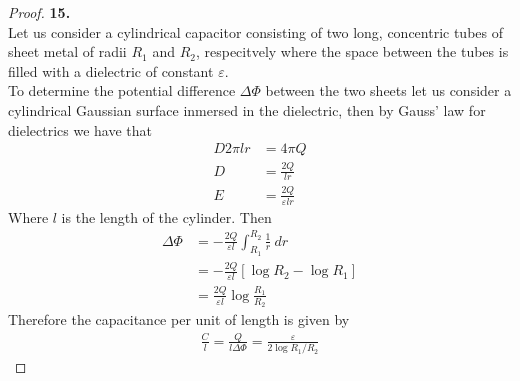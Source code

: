 \documentclass[11pt]{article}
\theoremstyle{definition}
\begin{document}
\cleardoublepage
\begin{proof}{\textbf{15.}}\\
Let us consider a cylindrical capacitor consisting of two long, concentric
tubes of sheet metal of radii $R_1$ and $R_2$, respecitvely where the space
between the tubes is filled with a dielectric of constant $\varepsilon$.
\\
To determine the potential difference $\Delta\Phi$ between the two sheets let
us consider a cylindrical Gaussian surface inmersed in the dielectric, then by
Gauss' law for dielectrics we have that
\begin{align*}
    D 2\pi l r &= 4\pi Q\\
    D &= \frac{2Q}{l r}\\
    E &= \frac{2Q}{\varepsilon lr}
\end{align*}
Where $l$ is the length of the cylinder. Then
\begin{align*}
    \Delta \Phi
    &= -\frac{2Q}{\varepsilon l} \int_{R_1}^{R_2} \frac{1}{r} ~dr\\
    &= -\frac{2Q}{\varepsilon l} [\log{R_2} - \log{R_1}]\\
    &= \frac{2Q}{\varepsilon l} \log \frac{R_1}{R_2}
\end{align*}
Therefore the capacitance per unit of length is given by
\begin{align*}
    \frac{C}{l} = \frac{Q}{l\Delta\Phi} = \frac{\varepsilon}{2\log R_1/R_2}
\end{align*}
\end{proof}
\end{document}
